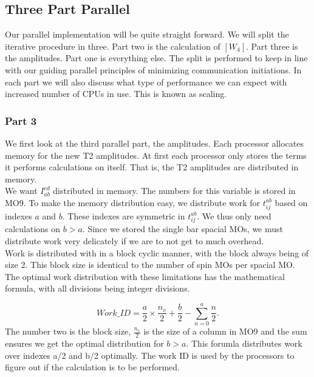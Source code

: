 \documentclass[a4paper,norsk,11pt,twoside]{report}
\begin{document}
\subsection{Three Part Parallel}
Our parallel implementation will be quite straight forward. We will split the iterative procedure in three. Part two is the calculation of $[W_4]$. Part three is the amplitudes. Part one is everything else. The split is performed to keep in line with our guiding parallel principles of minimizing communication initiations. In each part we will also discuss what type of performance we can expect with increased number of CPUs in use. This is known as scaling. \\

\subsubsection{Part 3}
We first look at the third parallel part, the amplitudes. Each processor allocates memory for the new T2 amplitudes. At first each processor only stores the terms it performs calculations on itself. That is, the T2 amplitudes are distributed in memory. \\

We want $I_{ab}^{cd}$ distributed in memory. The numbers for this variable is stored in MO9. To make the memory distribution easy, we distribute work for $t_{ij}^{ab}$ based on indexes $a$ and $b$. These indexes are symmetric in $t_{ij}^{ab}$. We thus only need calculations on $b > a$. Since we stored the single bar spacial MOs, we must distribute work very delicately if we are to not get to much overhead. \\

Work is distributed with in a block cyclic manner, with the block always being of size 2. This block size is identical to the number of spin MOs per spacial MO. The optimal work distribution with these limitations has the mathematical formula, with all divisions being integer divisions.

\begin{equation}
Work\_ID = \frac{a}{2} \times \frac{n_v}{2} + \frac{b}{2} - \sum_{n=0}^a \frac{n}{2} .
\end{equation}
The number two is the block size, $\frac{n_v}{2}$ is the size of a column in MO9 and the sum ensures we get the optimal distribution for $b > a$. This forumla distributes work over indexes a/2 and b/2 optimally. The work ID is used by the processors to figure out if the calculation is to be performed.
\end{document}
